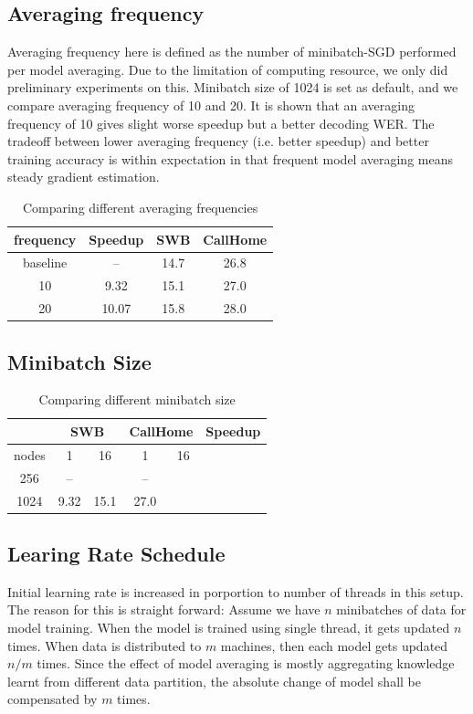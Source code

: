 \documentclass{article}
\begin{document}
\subsection{Averaging frequency}
Averaging frequency here is defined as the number of minibatch-SGD performed per model averaging.
Due to the limitation of computing resource, we only did preliminary experiments on this. Minibatch size of 1024 
is set as default, and we compare averaging frequency of 10 and 20. It is shown that an averaging frequency of 10 gives
slight worse speedup but a better decoding WER. The tradeoff between lower averaging frequency (i.e. better speedup) and
better training accuracy is within expectation in that frequent model averaging means steady gradient estimation.

\begin{table}
  \centering
  \begin{tabular}{c|c|c|c}
    \hline
    frequency   & Speedup   & SWB   & CallHome \\
    \hline
    baseline    &   --      & 14.7  & 26.8\\
    \hline
    10          & 9.32      & 15.1  & 27.0 \\
    \hline
    20          & 10.07     & 15.8  & 28.0 \\
    \hline
  \end{tabular}
  \caption{Comparing different averaging frequencies}
  \label{tab:init}
\end{table}

\subsection{Minibatch Size}
\begin{table}
  \centering
  \begin{tabular}{c|c|c|c|c|c}
    \hline
    & \multicolumn{2}{c|}{SWB}    & \multicolumn{2}{c}{CallHome} & Speedup\\
    \hline
    nodes       &  1    &   16    &    1       &   16   &    \\
    \hline
    256         &  --      &   &  --     &   & \\
    \hline
    1024        & 9.32     & 15.1  & 27.0     &   & \\
    \hline
  \end{tabular}
  \caption{Comparing different minibatch size}
  \label{tab:init}
\end{table}


\subsection{Learing Rate Schedule}
Initial learning rate is increased in porportion to number of threads in this setup. The reason for this is straight forward:
Assume we have $n$ minibatches of data for model training. When the model is trained using single thread, it gets updated $n$
times. When data is distributed to $m$ machines, then each model gets updated $n/m$ times. Since the effect of model averaging 
is mostly aggregating knowledge learnt from different data partition, the absolute change of model shall be compensated by 
$m$ times.
\end{document}
